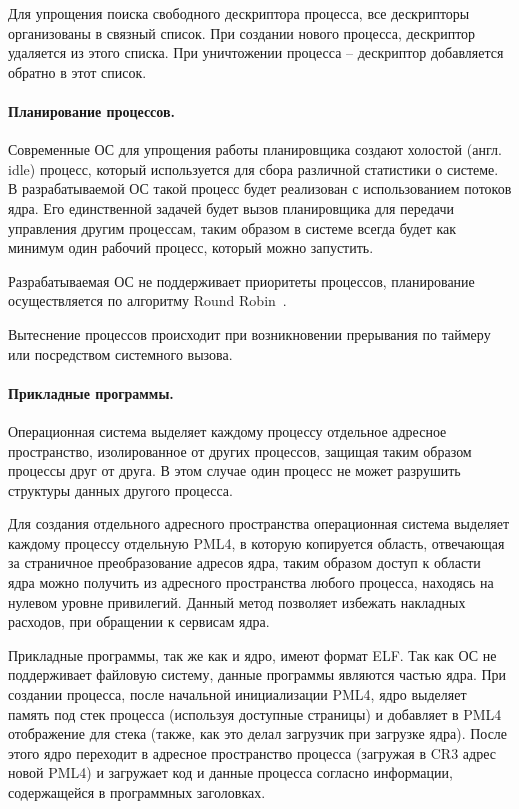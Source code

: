 Для упрощения поиска свободного дескриптора процесса, все дескрипторы организованы в связный список.
При создании нового процесса, дескриптор удаляется из этого списка. При уничтожении процесса --
дескриптор добавляется обратно в этот список.

\paragraph{Планирование процессов.}
Современные ОС для упрощения работы планировщика создают холостой (англ. idle) процесс,
который используется для сбора различной статистики о системе. В разрабатываемой ОС такой
процесс будет реализован с использованием потоков ядра. Его единственной задачей будет вызов
планировщика для передачи управления другим процессам, таким образом в системе всегда будет
как минимум один рабочий процесс, который можно запустить.

Разрабатываемая ОС не поддерживает приоритеты процессов, планирование осуществляется
по алгоритму Round Robin~\cite{tanenbaum}.

Вытеснение процессов происходит при возникновении прерывания по таймеру или посредством
системного вызова.

\paragraph{Прикладные программы.}
Операционная система выделяет каждому процессу отдельное адресное пространство, изолированное
от других процессов, защищая таким образом процессы друг от друга. В этом случае один процесс
не может разрушить структуры данных другого процесса.

Для создания отдельного адресного пространства операционная система выделяет каждому процессу
отдельную PML4, в которую копируется область, отвечающая за страничное преобразование адресов
ядра, таким образом доступ к области ядра можно получить из адресного пространства любого процесса,
находясь на нулевом уровне привилегий. Данный метод позволяет избежать накладных расходов, при
обращении к сервисам ядра.

Прикладные программы, так же как и ядро, имеют формат ELF. Так как ОС не поддерживает файловую
систему, данные программы являются частью ядра. При создании процесса, после начальной
инициализации PML4, ядро выделяет память под стек процесса (используя доступные страницы)
и добавляет в PML4 отображение для стека (также, как это делал загрузчик при загрузке ядра).
После этого ядро переходит в адресное пространство процесса (загружая в CR3 адрес новой PML4) и
загружает код и данные процесса согласно информации, содержащейся в программных заголовках.

